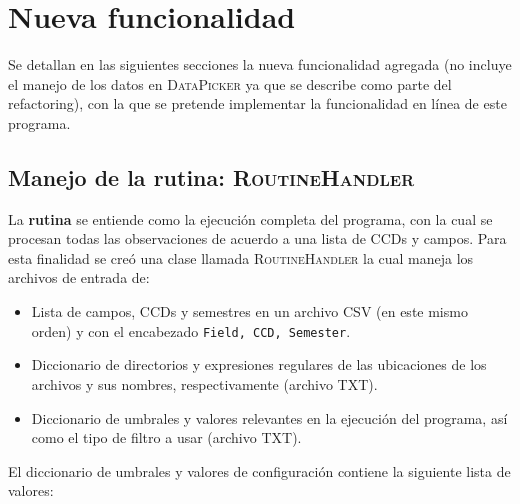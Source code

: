 \chapter{Nueva funcionalidad}
\label{ch:news}
Se detallan en las siguientes secciones la nueva funcionalidad agregada (no incluye el manejo de los datos en \textsc{DataPicker} ya que se describe como parte del refactoring), con la que se pretende implementar la funcionalidad en l\'inea de  este programa. 

\section{Manejo de la rutina: \textsc{RoutineHandler}}

La \textbf{rutina} se entiende como la ejecuci\'on completa del programa, con la cual se procesan todas las observaciones de acuerdo a una lista de CCDs y campos. Para esta finalidad se cre\'o una clase llamada \textsc{RoutineHandler} la cual maneja los archivos de entrada de:

\begin{itemize}
\item Lista de campos, CCDs y semestres en un archivo CSV (en este mismo orden) y con el encabezado \texttt{Field, CCD, Semester}.  
\item Diccionario de directorios y expresiones regulares de las ubicaciones de los archivos y sus nombres, respectivamente (archivo TXT). 
\item Diccionario de umbrales y valores relevantes en la ejecuci\'on del programa, as\'i como el tipo de filtro a usar (archivo TXT).
\end{itemize}
\bigskip

El diccionario de umbrales y valores de configuraci\'on contiene la siguiente lista de valores:

